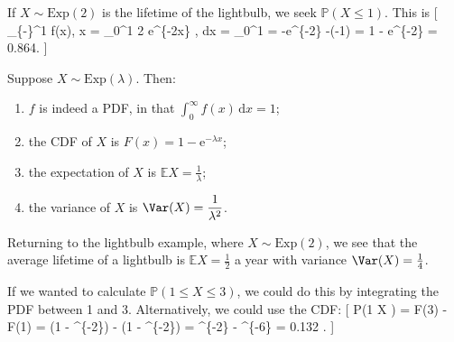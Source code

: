 \documentclass[
  letterpaper,
]{report}
\providecommand{\tightlist}{%
  \setlength{\itemsep}{0pt}\setlength{\parskip}{0pt}}\usepackage{longtable,booktabs,array}
\theoremstyle{definition}
\theoremstyle{definition}
\theoremstyle{remark}
\begin{document}
If \(X \sim \text{Exp}(2)\) is the lifetime of the lightbulb, we seek
\(\mathbb P(X \leq 1)\). This is {[} \int\_\{-\infty\}\^{}1 f(x),
x = \int\_0\^{}1 2 \mathrm e\^{}\{-2x\} , \mathrm dx =
\_0\^{}1 = -\mathrm e\^{}\{-2\} -(-1) = 1 -
\mathrm e\^{}\{-2\} = 0.864. {]}

\leavevmode{}%
Suppose \(X \sim \text{Exp}(\lambda)\). Then:

\begin{enumerate}
\def\labelenumi{\arabic{enumi}.}
\tightlist
\item
  \(f\) is indeed a PDF, in that
  \(\displaystyle\int_0^\infty f(x)\,\mathrm{d}x = 1\);
\item
  the CDF of \(X\) is \(F(x) = 1 - \mathrm{e}^{-\lambda x}\);
\item
  the expectation of \(X\) is
  \(\mathbb EX = \displaystyle\frac{1}{\lambda}\);
\item
  the variance of \(X\) is
  \(\Var(X) = \displaystyle\frac{1}{\lambda^2}\).
\end{enumerate}

Returning to the lightbulb example, where \(X \sim \text{Exp}(2)\), we
see that the average lifetime of a lightbulb is \(\mathbb EX = \frac12\)
a year with variance \(\Var(X) = \frac14\).

If we wanted to calculate \(\mathbb P(1 \leq X \leq 3)\), we could do
this by integrating the PDF between 1 and 3. Alternatively, we could use
the CDF: {[} \mathbb P(1 \leq X ) = F(3) - F(1) = (1 -
\^{}\{-2\}) - (1 - \^{}\{-2\}) =
\^{}\{-2\} - \^{}\{-6\} = 0.132 . {]}
\end{document}
